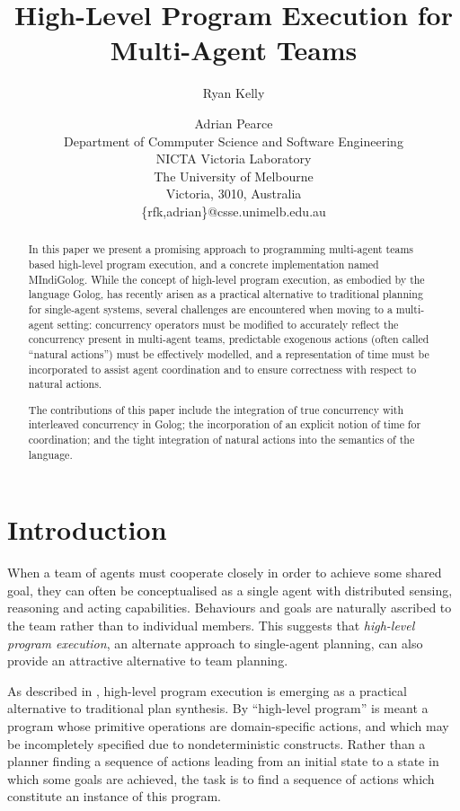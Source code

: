 \documentclass[letterpaper]{article}
\title{High-Level Program Execution for Multi-Agent Teams}
\author{Ryan Kelly \and Adrian Pearce \\
Department of Commputer Science and Software Engineering \\
NICTA Victoria Laboratory \\
The University of Melbourne \\
Victoria, 3010, Australia \\
\{rfk,adrian\}@csse.unimelb.edu.au}
\begin{document}
\maketitle

\begin{abstract}
In this paper we present a promising approach to programming multi-agent
teams based high-level program execution, and a concrete implementation
named MIndiGolog. While the concept of high-level program execution,
as embodied by the language Golog, has recently arisen as a practical
alternative to traditional planning for single-agent systems, several
challenges are encountered when moving to a multi-agent setting: concurrency
operators must be modified to accurately reflect the concurrency present
in multi-agent teams, predictable exogenous actions (often called
``natural actions'') must be effectively modelled, and a representation
of time must be incorporated to assist agent coordination and to ensure
correctness with respect to natural actions. 

The contributions of this paper include the integration of true concurrency
with interleaved concurrency in Golog; the incorporation of an explicit
notion of time for coordination; and the tight integration of natural
actions into the semantics of the language.
\end{abstract}

\section{Introduction}

When a team of agents must cooperate closely in order to achieve some
shared goal, they can often be conceptualised as a single agent with
distributed sensing, reasoning and acting capabilities. Behaviours
and goals are naturally ascribed to the team rather than to individual
members. This suggests that \emph{high-level program execution}, an
alternate approach to single-agent planning, can also provide an attractive
alternative to team planning.

As described in \cite{giacomo99indigolog}, high-level program execution
is emerging as a practical alternative to traditional plan
synthesis. By ``high-level program'' is meant a program whose
primitive operations are domain-specific actions, and which may be
incompletely specified due to nondeterministic constructs. Rather
than a planner finding a sequence of actions leading from an initial
state to a state in which some goals are achieved, the task is to
find a sequence of actions which constitute an instance of this program.
\end{document}
